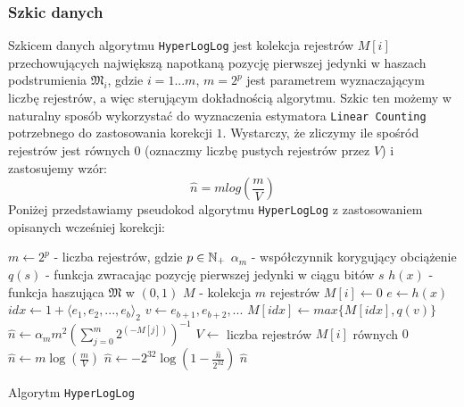 \subsubsection{Szkic danych}
Szkicem danych algorytmu \texttt{HyperLogLog} jest kolekcja rejestrów $M[i]$ przechowujących największą napotkaną pozycję pierwszej jedynki w haszach podstrumienia $\mathfrak{M}_i$, gdzie $i = 1 ... m$, $m = 2^p$ jest parametrem wyznaczającym liczbę rejestrów, a więc sterującym dokładnością algorytmu. Szkic ten możemy w naturalny sposób wykorzystać do wyznaczenia estymatora \texttt{Linear Counting} potrzebnego do zastosowania korekcji $1.$ Wystarczy, że zliczymy ile spośród rejestrów jest równych $0$ (oznaczmy liczbę pustych rejestrów przez $V$) i zastosujemy wzór:
\begin{equation}
	\hat{n} = {m}log(\frac{m}{V})
\end{equation}
 Poniżej przedstawiamy pseudokod algorytmu \texttt{HyperLogLog} z zastosowaniem opisanych wcześniej korekcji:
\newline
\begin{algorithm}
    \begin{algorithmic}
    \State $m \gets 2^p$ - liczba rejestrów, gdzie $p \in {\mathbb{N}}_{+}$
    \State ${\alpha}_m $ - współczynnik korygujący obciążenie
    \State $q(s) $ -  funkcja zwracając pozycję pierwszej jedynki w ciągu bitów $s$ 
    \State $h(x)  $  - funkcja haszująca $\mathfrak{M}$ w $(0, 1)$
    \State $M $  - kolekcja $m$ rejestrów 
    \newline
        \State $M[i] \gets 0$
    \EndFor
    \newline
        \State $e \gets h(x)$
        \State $idx \gets 1 + {{\langle}e_1, e_2, ..., e_b{\rangle}}_2$
        \State $v \gets e_{b+1}, e_{b+2}, ...$
        \State $M[idx] \gets max\{M[idx], q(v)\}$
    \EndFunction
    \newline
        \State $\hat{n} \gets {\alpha}_{m}{m}^2(\sum_{j=0}^{m} 2^{(-M[j])})^{-1}$
            \State $V \gets $ liczba rejestrów $M[i]$ równych $0$
                \State $\hat{n} \gets {m}\log(\frac{m}{V})$
            \EndIf
            \State $\hat{n} \gets -2^{32}\log(1 - \frac{\hat{n}}{2^{32}})$
        \EndIf
        \State \Return $\hat{n}$
    \EndFunction
    
    \end{algorithmic}
    \caption{Algorytm \texttt{HyperLogLog}}
\end{algorithm}

